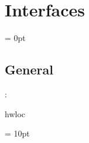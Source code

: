 
\section{Interfaces} 


\parskip = 0pt

\vspace{3mm} \subsection*{General}

: 

hwloc
\vspace{2mm}

\vspace{5mm}\parskip = 10pt 
